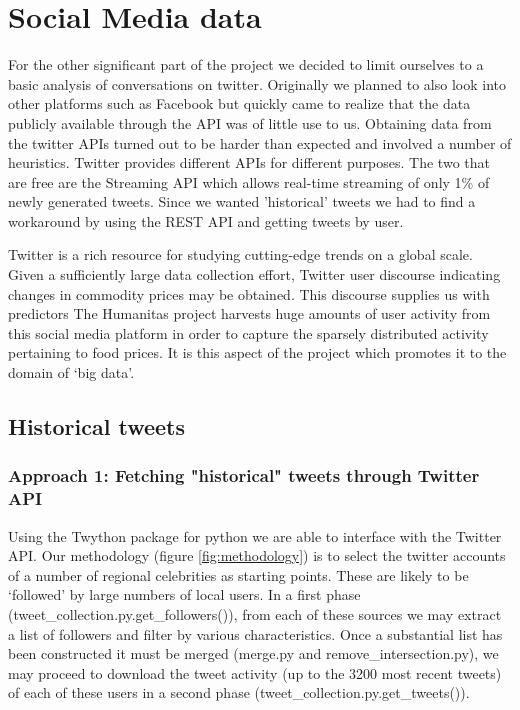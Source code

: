 
\section*{Social Media data}
For the other significant part of the project we decided to limit ourselves to a basic analysis of conversations on twitter. Originally we planned to also look into other platforms such as Facebook but quickly came to realize that the data publicly available through the API was of little use to us. Obtaining data from the twitter APIs turned out to be harder than expected and involved a number of heuristics. Twitter provides different APIs for different purposes. The two that are free are the Streaming API which allows real-time streaming of only 1\% of newly generated tweets. Since we wanted 'historical' tweets we had to find a workaround by using the REST API and getting tweets by user.\par
Twitter is a rich resource for studying cutting-edge trends on a global scale. Given a sufficiently large data collection effort, Twitter user discourse indicating changes in commodity prices may be obtained. This discourse supplies us with predictors The Humanitas project harvests huge amounts of user activity from this social media platform in order to capture the sparsely distributed activity pertaining to food prices. It is this aspect of the project which promotes it to the domain of `big data'.

\subsection*{Historical tweets}

\subsubsection*{Approach 1: Fetching "historical" tweets through Twitter API}

Using the Twython package for python we are able to interface with the Twitter API. Our methodology (figure \ref{fig:methodology}) is to select the twitter accounts of a number of regional celebrities as starting points. These are likely to be `followed' by large numbers of local users. In a first phase (tweet\_collection.py.get\_followers()), from each of these sources we may extract a list of followers and filter by various characteristics. Once a substantial list has been constructed it must be merged (merge.py and remove\_intersection.py), we may proceed to download the tweet activity (up to the 3200 most recent tweets) of each of these users in a second phase (tweet\_collection.py.get\_tweets()).

